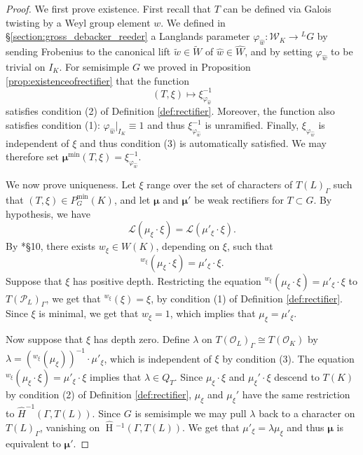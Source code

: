 \documentclass{amsart}
\theoremstyle{plain}
\newcommand{\HT}[1]{\hat{\HH}{}^{#1}}
\theoremstyle{definition}
\numberwithin{equation}{section}
\DeclareMathOperator{\HH}{H}
\newcommand{\OK}{\mathcal{O}_K}
\newcommand{\PL}{\mathcal{P}_L}
\newcommand{\OL}{\mathcal{O}_L}
\newcommand{\Weil}{\mathcal{W}}
\newcommand{\Lpack}{\mathcal{L}}
\newcommand{\Pmin}{P_G^{\min}}
\newcommand{\bmu}{\boldsymbol\mu}
\newcommand{\mumin}{\bmu^{\min}}
\begin{document}
\begin{proof}
We first prove existence.
First recall that $T$ can be defined
via Galois twisting by a Weyl group element $w$.  We defined in
\S\ref{section:gross_debacker_reeder}
a Langlands parameter $\varphi_{\hat{w}} :\Weil _K \rightarrow {}^L G$ by
sending Frobenius to the canonical lift
$\tilde{w} \in \widetilde{W}$ of $\hat{w} \in \hat{W}$, and by setting
$\varphi_{\hat{w}}$ to be trivial on $I_K$.
For semisimple $G$
we proved in Proposition \ref{prop:existenceofrectifier}
that the function $$(T, \xi) \mapsto \xi_{\varphi_{\hat{w}}}^{-1}$$
satisfies condition (2) of Definition \ref{def:rectifier}.  Moreover, the function also
satisfies condition (1): $\varphi_{\hat{w}}|_{I_K} \equiv 1$ and thus
$\xi_{\varphi_{\hat{w}}}^{-1}$ is unramified.
Finally, $\xi_{\varphi_{\hat{w}}}$ is independent of $\xi$
and thus condition (3) is automatically satisfied.
We may therefore set
$\mumin(T,\xi) = \xi_{\varphi_{\hat{w}}}^{-1}$.

We now prove uniqueness.
Let $\xi$ range over the set of characters of $T(L)_{\Gamma}$
such that $(T, \xi) \in \Pmin(K)$, and let
$\bmu$ and $\bmu'$ be weak rectifiers for
$T \subset G$.  By hypothesis, we have
$$\Lpack(\mu_{\xi} \cdot \xi) = \Lpack(\mu'_{\xi} \cdot \xi).$$
By \cite{murnaghan:11}*{\S10}, there exists $w_{\xi} \in W(K)$,
depending on $\xi$, such that
$${}^{w_{\xi}} (\mu_\xi \cdot \xi) = \mu'_\xi \cdot \xi.$$
Suppose that $\xi$ has positive depth.
Restricting the equation
${}^{w_\xi} (\mu_\xi \cdot \xi) = \mu'_\xi \cdot \xi$
to $T(\PL)_{\Gamma}$, we get that ${}^{w_{\xi}} (\xi) = \xi$,
by condition (1) of Definition \ref{def:rectifier}.
Since $\xi$ is minimal, we get that $w_{\xi} = 1$, which implies
that $\mu_{\xi} = \mu'_{\xi}$.

Now suppose that $\xi$ has depth zero.
Define $\lambda$ on $T(\OL)_{\Gamma} \cong T(\OK)$ by $\lambda = ({}^{w_\xi} (\mu_\xi))^{-1} \cdot \mu'_\xi$,
which is independent of $\xi$ by condition (3). The equation ${}^{w_\xi} (\mu_\xi \cdot \xi) = \mu'_\xi \cdot \xi$
implies that $\lambda \in Q_T$.  Since $\mu_\xi \cdot \xi$ and $\mu_\xi' \cdot \xi$ descend to
$T(K)$ by condition (2) of Definition \ref{def:rectifier}, $\mu_\xi$ and $\mu_\xi'$ have the
same restriction to $\hat{H}^{-1}(\Gamma, T(L))$.  Since $G$ is semisimple we may pull $\lambda$ back to
a character on $T(L)_\Gamma$, vanishing on $\HT{-1}(\Gamma, T(L))$.  We get that $\mu'_\xi = \lambda\mu_\xi$
and thus $\bmu$ is equivalent to $\bmu'$.
\end{proof}
\end{document}
